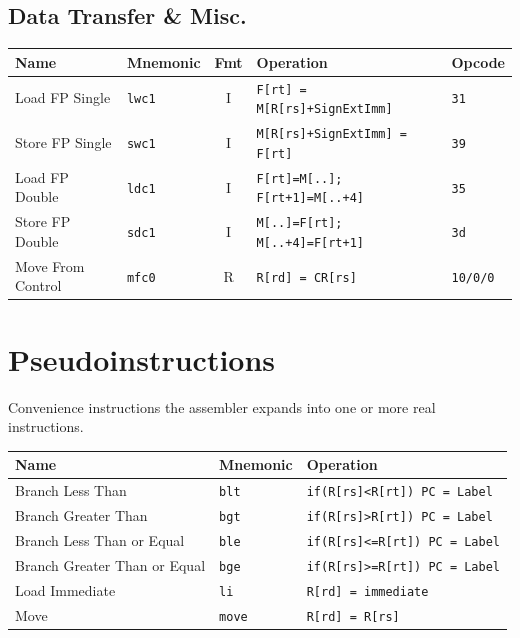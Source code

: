 \documentclass[10pt]{article}
\newcommand{\op}[1]{\texttt{#1}}
\begin{document}
\subsection{Data Transfer \& Misc.}
\begin{center}
\small
\begin{tabular}{@{}p{3.0cm}p{1.6cm}cp{6.1cm}l@{}}
\toprule
Name & Mnemonic & Fmt & Operation & Opcode \\
\midrule
Load FP Single  & \op{lwc1} & I & \op{F[rt] = M[R[rs]+SignExtImm]} & \op{31} \\
Store FP Single & \op{swc1} & I & \op{M[R[rs]+SignExtImm] = F[rt]} & \op{39} \\
Load FP Double   & \op{ldc1} & I & \op{F[rt]=M[..]; F[rt+1]=M[..+4]} & \op{35} \\
Store FP Double  & \op{sdc1} & I & \op{M[..]=F[rt]; M[..+4]=F[rt+1]} & \op{3d} \\
Move From Control & \op{mfc0} & R & \op{R[rd] = CR[rs]} & \op{10/0/0} \\
\bottomrule
\end{tabular}
\end{center}

\section{Pseudoinstructions}
Convenience instructions the assembler expands into one or more real
instructions.

\begin{center}
\begin{tabular}{@{}p{4.6cm}lp{6.5cm}@{}}
\toprule
Name & Mnemonic & Operation \\
\midrule
Branch Less Than            & \op{blt} & \op{if(R[rs]\textless R[rt]) PC = Label} \\
Branch Greater Than         & \op{bgt} & \op{if(R[rs]\textgreater R[rt]) PC = Label} \\
Branch Less Than or Equal   & \op{ble} & \op{if(R[rs]\textless=R[rt]) PC = Label} \\
Branch Greater Than or Equal& \op{bge} & \op{if(R[rs]\textgreater=R[rt]) PC = Label} \\
Load Immediate              & \op{li}  & \op{R[rd] = immediate} \\
Move                        & \op{move}& \op{R[rd] = R[rs]} \\
\bottomrule
\end{tabular}
\end{center}
\end{document}
